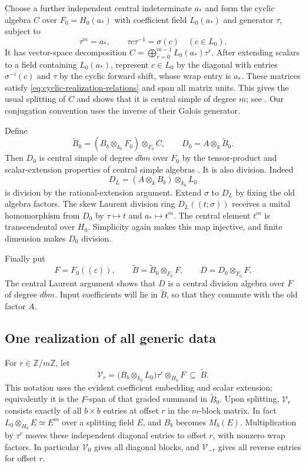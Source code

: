 \documentclass[11pt]{article}
\theoremstyle{definition}
\theoremstyle{remark}
\numberwithin{equation}{section}
\begin{document}
Choose a further independent central indeterminate $a_*$ and form the
cyclic algebra $C$ over $F_0=H_0(a_*)$ with coefficient field
$L_0(a_*)$ and generator $\tau$, subject to
\begin{equation}
 \tau^m=a_*,\qquad \tau c\tau^{-1}=\sigma(c)
 \quad(c\in L_0).
 \label{eq:cyclic-realization-relations}
\end{equation}
It has vector-space decomposition
$C=\bigoplus_{r=0}^{m-1}L_0(a_*)\tau^r$.
After extending scalars to a field containing $L_0(a_*)$, represent
$c\in L_0$ by the diagonal with entries $\sigma^{-i}(c)$ and
$\tau$ by the cyclic forward shift, whose wrap entry is $a_*$.
These matrices satisfy \eqref{eq:cyclic-realization-relations} and
span all matrix units.  This gives the usual splitting of $C$ and
shows that it is central simple of degree $m$; see
\cite[Construction~2.5.1 and Proposition~2.5.2]{GilleSzamuely2006}.
Our conjugation convention uses the inverse of their Galois generator.

Define
\[
 \widetilde B_0=(B_b\otimes_{k_0}F_0)\otimes_{F_0}C,
 \qquad D_0=A\otimes_k\widetilde B_0.
\]
Then $D_0$ is central simple of degree $dbm$ over $F_0$ by the tensor-product and scalar-extension properties of
central simple algebras
\cite[Chapter~IV, Corollary~2.8 and Proposition~2.15]{MilneCFT}.
It is also division. Indeed
\[
 D_L=(A\otimes_k B_b)\otimes_{k_0}L_0
\]
is division by the rational-extension argument.  Extend $\sigma$ to
$D_L$ by fixing the old algebra factors.  The skew Laurent division
ring $D_L((t;\sigma))$ receives a unital homomorphism from $D_0$
by $\tau\mapsto t$ and $a_*\mapsto t^m$.  The central element
$t^m$ is transcendental over $H_0$.  Simplicity again makes this map
injective, and finite dimension makes $D_0$ division.

Finally put
\[
 F=F_0((\varepsilon)),\qquad
 \widetilde B=\widetilde B_0\otimes_{F_0}F,\qquad
 D=D_0\otimes_{F_0}F.
\]
The central Laurent argument shows that $D$ is a central division
algebra over $F$ of degree $dbm$.  Input coefficients will lie in
$\widetilde B$, so that they commute with the old factor $A$.

\subsection{One realization of all generic data}

For $r\in\mathbb Z/m\mathbb Z$, let
\[
 \mathcal V_r=
 \bigl(B_b\otimes_{k_0}L_0\bigr)\tau^r
 \otimes_{H_0}F
 \ \subseteq\ \widetilde B.
\]
This notation uses the evident coefficient embedding and scalar
extension; equivalently it is the $F$-span of that graded summand in
$\widetilde B_0$.  Upon splitting, $\mathcal V_r$ consists exactly
of all $b\times b$ entries at offset $r$ in the $m$-block matrix.
In fact $L_0\otimes_{H_0}E\simeq E^m$ over a splitting field $E$,
and $B_b$ becomes $M_b(E)$.  Multiplication by $\tau^r$ moves these
independent diagonal entries to offset $r$, with nonzero wrap factors.
In particular $\mathcal V_0$ gives all diagonal blocks, and
$\mathcal V_{-r}$ gives all reverse entries for offset $r$.
\end{document}
